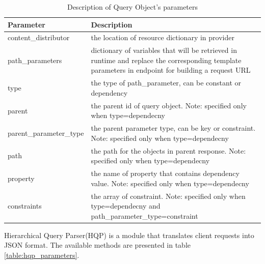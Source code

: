 \begin{center}
	\begin{table}
	  	\caption{Description of Query Object's parameters}
	 	\label{table:query_obj_desrc}
	  	\begin{tabular}{|l|p{4in}|}
	    \hline
	    Parameter & Description  \\ \hline
	    content\_distributor & the location of resource dictionary in provider  \\ \hline
	    path\_parameters & dictionary of variables that will be retrieved in runtime and replace the corresponding template parameters in endpoint for building a request URL  \\ \hline
	    type & the type of path\_parameter, can be constant or dependency  \\ \hline
	    parent & the parent id of query object. Note: specified only when type=dependecny \\ \hline
	    parent\_parameter\_type & the parent parameter type, can be key or constraint. Note: specified only when type=dependecny \\ \hline
	    path & the path for the objects in parent response. Note: specified only when type=dependecny \\ \hline
	    property & the name of property that contains dependency value. Note: specified only when type=dependecny \\ \hline
	    constraints & the array of constraint. Note: specified only when type=dependecny  and path\_parameter\_type=constraint\\ \hline
	    \hline
		\end{tabular}
  	\end{table}
\end{center}


Hierarchical Query Parser(HQP) is a module that translates client requests into JSON format. The available methods are presented in table \ref{table:hqp_parameters}.


